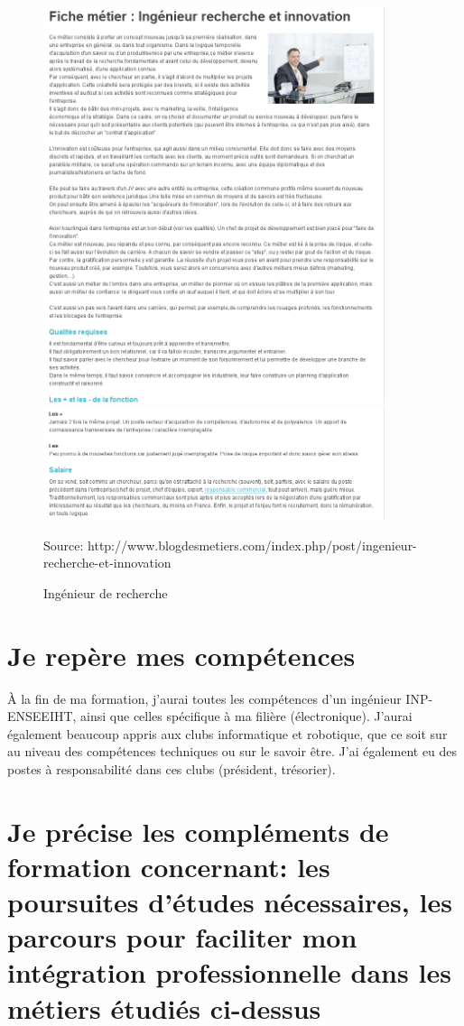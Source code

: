 \documentclass[10pt]{article}
\begin{document}
\begin{figure}
    \begin{center}
        \includegraphics[width=10cm]{irech}
        \includegraphics[width=10cm]{irech2}
    \end{center}
    \caption{Ingénieur de recherche}
    Source: http://www.blogdesmetiers.com/index.php/post/ingenieur-recherche-et-innovation
\end{figure}

\section{Je repère mes compétences}
À la fin de ma formation, j’aurai toutes les compétences d’un ingénieur INP-ENSEEIHT,
ainsi que celles spécifique à ma filière (électronique). J’aurai également beaucoup
appris aux clubs informatique et robotique, que ce soit sur au niveau des compétences
techniques ou sur le savoir être. J’ai également eu des postes à responsabilité dans ces
clubs (président, trésorier).

\section{Je précise les compléments de formation concernant: les poursuites d’études nécessaires,
les parcours pour faciliter mon intégration professionnelle dans les métiers étudiés ci-dessus}
\end{document}
